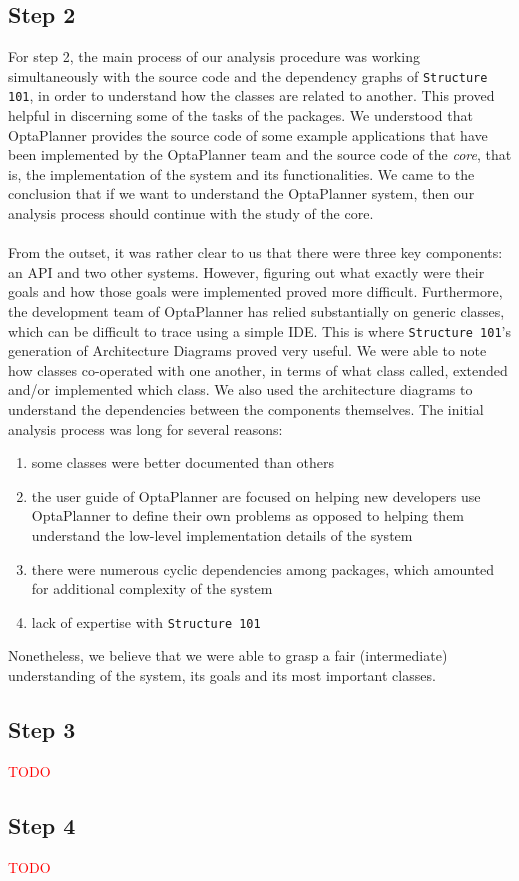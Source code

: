 \subsection{Step 2}
For step 2, the main process of our analysis procedure was working simultaneously with the source code and the dependency graphs of \verb!Structure 101!, in order to understand how the classes are related to another. This proved helpful in discerning some of the tasks of the packages. 
We understood that OptaPlanner provides the source code of some example applications that have been implemented by the OptaPlanner team and the source code of the \textit{core}, that is, the implementation of the system and its functionalities. We came to the conclusion that if we want to understand the OptaPlanner system, then our analysis process should continue with the study of the core.\\\\
From the outset, it was rather clear to us that there were three key components: an API and two other systems. However, figuring out what exactly were their goals and how those goals were implemented proved more difficult. Furthermore, the development team of OptaPlanner has relied substantially on generic classes, which can be difficult to trace using a simple IDE. This is where \verb!Structure 101!’s generation of Architecture Diagrams proved very useful. We were able to note how classes co-operated with one another, in terms of what class called, extended and/or implemented which class. We also used the architecture diagrams to understand the dependencies between the components themselves. The initial analysis process was long for several reasons:
\begin{enumerate}[label=(\roman*)]
    \item some classes were better documented than others
    \item the user guide of OptaPlanner are focused on helping new developers use OptaPlanner to define their own problems as opposed to helping them understand the low-level implementation details of the system
    \item there were numerous cyclic dependencies among packages, which amounted for additional complexity of the system
    \item lack of expertise with \verb!Structure 101!
\end{enumerate}
Nonetheless, we believe that we were able to grasp a fair (intermediate) understanding of the system, its goals and its most important classes.
\subsection{Step 3}
    \textcolor{red}{TODO}
\subsection{Step 4}
    \textcolor{red}{TODO}